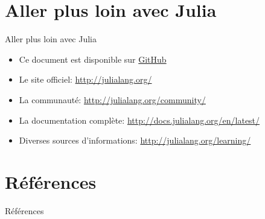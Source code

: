 \section{Aller plus loin avec Julia}
\begin{frame}[containsverbatim]{Aller plus loin avec Julia}
\begin{itemize}
\item Ce document est disponible sur \href{https://github.com/mcanouil/Presentation/tree/master/JULIA_TP}{GitHub}
\vspace{2ex}
\item Le site officiel: \href{http://julialang.org/}{http\hspace{-0.5ex}://julialang.org/}
\item La communauté: \href{http://julialang.org/community/}{http\hspace{-0.5ex}://julialang.org/community/}
\item La documentation complète: \href{http://docs.julialang.org/en/latest/}{http\hspace{-0.5ex}://docs.julialang.org/en/latest/}
\item Diverses sources d’informations: \href{http://julialang.org/learning/}{http\hspace{-0.5ex}://julialang.org/learning/}
\end{itemize}
\end{frame}

\section{Références}
\begin{frame}{Références}
    
    
    \nocite{*}
\end{frame}

